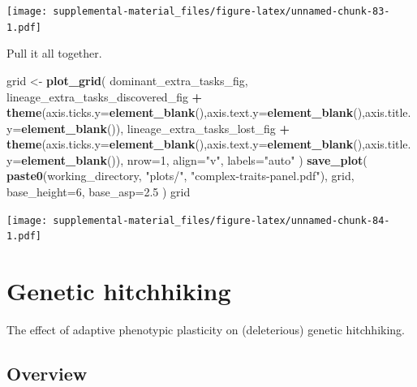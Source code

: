 \documentclass[]{book}
\newenvironment{Shaded}{\begin{snugshade}}{\end{snugshade}}
\newcommand{\DataTypeTok}[1]{\textcolor[rgb]{0.13,0.29,0.53}{#1}}
\newcommand{\DecValTok}[1]{\textcolor[rgb]{0.00,0.00,0.81}{#1}}
\newcommand{\FloatTok}[1]{\textcolor[rgb]{0.00,0.00,0.81}{#1}}
\newcommand{\KeywordTok}[1]{\textcolor[rgb]{0.13,0.29,0.53}{\textbf{#1}}}
\newcommand{\NormalTok}[1]{#1}
\newcommand{\OperatorTok}[1]{\textcolor[rgb]{0.81,0.36,0.00}{\textbf{#1}}}
\newcommand{\StringTok}[1]{\textcolor[rgb]{0.31,0.60,0.02}{#1}}
\begin{document}
\texttt{[image: supplemental-material\_files/figure-latex/unnamed-chunk-83-1.pdf]}

Pull it all together.

\begin{Shaded}
\begin{Highlighting}[]
\NormalTok{grid <-}\StringTok{ }\KeywordTok{plot_grid}\NormalTok{(}
\NormalTok{  dominant_extra_tasks_fig,}
\NormalTok{  lineage_extra_tasks_discovered_fig }\OperatorTok{+}\StringTok{ }\KeywordTok{theme}\NormalTok{(}\DataTypeTok{axis.ticks.y=}\KeywordTok{element_blank}\NormalTok{(),}\DataTypeTok{axis.text.y=}\KeywordTok{element_blank}\NormalTok{(),}\DataTypeTok{axis.title.y=}\KeywordTok{element_blank}\NormalTok{()),}
\NormalTok{  lineage_extra_tasks_lost_fig }\OperatorTok{+}\StringTok{ }\KeywordTok{theme}\NormalTok{(}\DataTypeTok{axis.ticks.y=}\KeywordTok{element_blank}\NormalTok{(),}\DataTypeTok{axis.text.y=}\KeywordTok{element_blank}\NormalTok{(),}\DataTypeTok{axis.title.y=}\KeywordTok{element_blank}\NormalTok{()),}
  \DataTypeTok{nrow=}\DecValTok{1}\NormalTok{,}
  \DataTypeTok{align=}\StringTok{"v"}\NormalTok{,}
  \DataTypeTok{labels=}\StringTok{"auto"}
\NormalTok{)}
\KeywordTok{save_plot}\NormalTok{(}
   \KeywordTok{paste0}\NormalTok{(working_directory, }\StringTok{"plots/"}\NormalTok{, }\StringTok{"complex-traits-panel.pdf"}\NormalTok{),}
\NormalTok{   grid,}
   \DataTypeTok{base_height=}\DecValTok{6}\NormalTok{,}
   \DataTypeTok{base_asp=}\FloatTok{2.5}
\NormalTok{)}
\NormalTok{grid}
\end{Highlighting}
\end{Shaded}

\texttt{[image: supplemental-material\_files/figure-latex/unnamed-chunk-84-1.pdf]}

\hypertarget{genetic-hitchhiking}{%
\chapter{Genetic hitchhiking}\label{genetic-hitchhiking}}

The effect of adaptive phenotypic plasticity on (deleterious) genetic hitchhiking.

\hypertarget{overview-3}{%
\section{Overview}\label{overview-3}}
\end{document}
